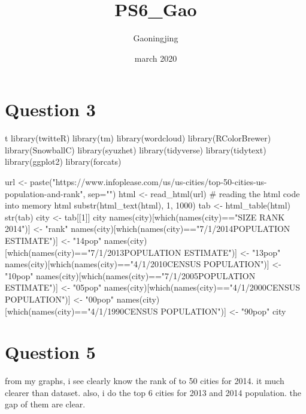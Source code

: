 \documentclass{article}
\title{PS6_Gao}
\author{Gaoningjing }
\date{march 2020}
\begin{document}
\maketitle

\section{Question 3}
t  
library(twitteR)
library(tm)
library(wordcloud)
library(RColorBrewer)
library(SnowballC)
library(syuzhet)
library(tidyverse)
library(tidytext)
library(ggplot2)
library(forcats)

url <- paste("https://www.infoplease.com/us/us-cities/top-50-cities-us-population-and-rank",
    sep="")
html <- read_html(url) # reading the html code into memory
html
substr(html_text(html), 1, 1000)
tab <- html_table(html)
str(tab)
city <- tab[[1]]
city
names(city)[which(names(city)=="SIZE RANK 2014")] <- "rank"
names(city)[which(names(city)=="7/1/2014POPULATION ESTIMATE")] <- "14pop"
names(city)[which(names(city)=="7/1/2013POPULATION ESTIMATE")] <- "13pop"
names(city)[which(names(city)=="4/1/2010CENSUS POPULATION")] <- "10pop"
names(city)[which(names(city)=="7/1/2005POPULATION ESTIMATE")] <- "05pop"
names(city)[which(names(city)=="4/1/2000CENSUS POPULATION")] <- "00pop"
names(city)[which(names(city)=="4/1/1990CENSUS POPULATION")] <- "90pop"
city

\section{Question 5}
 from my graphs, i see clearly know the rank of to 50 cities for 2014. it much clearer than dataset. also, i do the top 6 cities for 2013 and 2014 population. the gap of them are clear.
\end{document}
